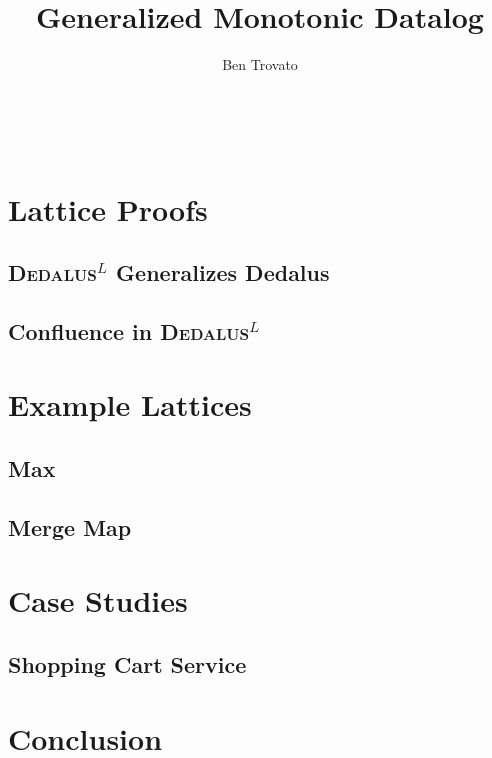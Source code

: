 \documentclass{vldb}
\def\latlang{\textsc{Dedalus}$^L$\xspace}
\begin{document}
\title{Generalized Monotonic Datalog}


\author{
\alignauthor
Ben Trovato\\
       \\
       \\
       \\
}

\maketitle

\begin{abstract}
\end{abstract}



\section{Lattice Proofs}

\subsection{\latlang Generalizes Dedalus}

\subsection{Confluence in \latlang}



\section{Example Lattices}

\subsection{Max}

\subsection{Merge Map}

\section{Case Studies}



\subsection{Shopping Cart Service}



\section{Conclusion}



\end{document}
